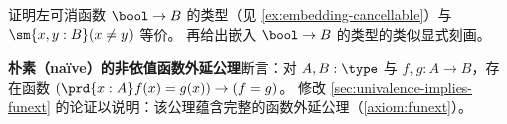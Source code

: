 \begin{ex}\label{ex:cancellable-from-bool}
  证明左可消函数 $\bool\to B$ 的类型（见 \cref{ex:embedding-cancellable}）与 $\sm{x,y:B}(x\neq y)$ 等价。
  再给出嵌入 $\bool\to B$ 的类型的类似显式刻画。
\end{ex}

\begin{ex}\label{ex:funext-from-nondep}
  \textbf{朴素（na\"{i}ve）的非依值函数外延公理}断言：对 $A,B:\type$ 与 $f,g:A\to B$，存在函数 $(\prd{x:A} f(x)=g(x)) \to (f=g)$。
  修改 \cref{sec:univalence-implies-funext} 的论证以说明：该公理蕴含完整的函数外延公理（\cref{axiom:funext}）。
\end{ex}

